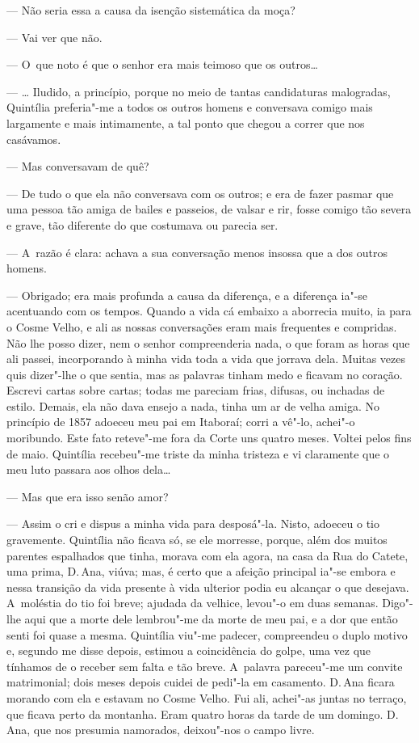\begin{linenumbers}
--- Não seria essa a causa da isenção sistemática da moça?

--- Vai ver que não.

--- O~que noto é que o senhor era mais teimoso que os outros\ldots{}

--- \ldots{} Iludido, a princípio, porque no meio de tantas candidaturas
malogradas, Quintília preferia"-me a todos os outros homens e conversava
comigo mais largamente e mais intimamente, a tal ponto que chegou a
correr que nos casávamos.

--- Mas conversavam de quê?

--- De tudo o que ela não conversava com os outros; e era de fazer pasmar
que uma pessoa tão amiga de bailes e passeios, de valsar e rir, fosse
comigo tão severa e grave, tão diferente do que costumava ou parecia
ser.

--- A~razão é clara: achava a sua conversação menos insossa que a dos
outros homens.

--- Obrigado; era mais profunda a causa da diferença, e a diferença ia"-se
acentuando com os tempos. Quando a vida cá embaixo a aborrecia muito, ia
para o Cosme Velho, e ali as nossas conversações eram mais frequentes e
compridas. Não lhe posso dizer, nem o senhor compreenderia nada, o que
foram as horas que ali passei, incorporando à minha vida toda a vida que
jorrava dela. Muitas vezes quis dizer"-lhe o que sentia, mas as palavras
tinham medo e ficavam no coração. Escrevi cartas sobre cartas; todas me
pareciam frias, difusas, ou inchadas de estilo. Demais, ela não dava
ensejo a nada, tinha um ar de velha amiga. No princípio de 1857 adoeceu
meu pai em Itaboraí; corri a vê"-lo, achei"-o moribundo. Este fato
reteve"-me fora da Corte uns quatro meses. Voltei pelos fins de maio.
Quintília recebeu"-me triste da minha tristeza e vi claramente que o meu
luto passara aos olhos dela\ldots{}

--- Mas que era isso senão amor?

--- Assim o cri e dispus a minha vida para desposá"-la. Nisto, adoeceu o
tio gravemente. Quintília não ficava só, se ele morresse, porque, além
dos muitos parentes espalhados que tinha, morava com ela agora, na casa
da Rua do Catete, uma prima, D.\,Ana, viúva; mas, é certo que a afeição
principal ia"-se embora e nessa transição da vida presente à vida
ulterior podia eu alcançar o que desejava. A~moléstia do tio foi breve;
ajudada da velhice, levou"-o em duas semanas. Digo"-lhe aqui que a morte
dele lembrou"-me da morte de meu pai, e a dor que então senti foi quase a
mesma. Quintília viu"-me padecer, compreendeu o duplo motivo e, segundo
me disse depois, estimou a coincidência do golpe, uma vez que tínhamos
de o receber sem falta e tão breve. A~palavra pareceu"-me um convite
matrimonial; dois meses depois cuidei de pedi"-la em casamento. D.\,Ana
ficara morando com ela e estavam no Cosme Velho. Fui ali, achei"-as
juntas no terraço, que ficava perto da montanha. Eram quatro horas da
tarde de um domingo. D.\,Ana, que nos presumia namorados, deixou"-nos o
campo livre.


\end{linenumbers}
